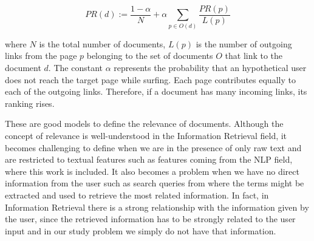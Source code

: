 \[\displaystyle PR(d) :=   \frac{1-\alpha}{N}  + \alpha \sum_{p\in O(d)} \frac{PR(p)}{L(p)}\]

where $N$ is the total number of documents, $L(p)$ is the number of outgoing links from the page $p$ belonging to the set of documents $O$ that link to the document $d$. The constant $\alpha$ represents the probability that an hypothetical user does not reach the target page while surfing. Each page contributes equally to each of the outgoing links. Therefore, if a document has many incoming links, its ranking rises. 

These are good models to define the relevance of documents. Although the concept of relevance is well-understood in the Information Retrieval field, it becomes challenging to define when we are in the presence of only raw text and are restricted to textual features such as features coming from the NLP field, where this work is included. It also becomes a problem when we have no direct information from the user such as search queries from where the terms might be extracted and used to retrieve the most related information. In fact, in Information Retrieval there is a strong relationship with the information given by the user, since the retrieved information has to be strongly related to the user input and in our study problem we simply do not have that information. 

